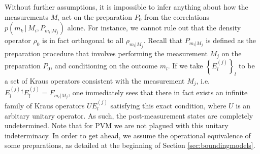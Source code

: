 Without further assumptions, it is impossible to infer anything about how the measurements $M_i$ act on the preparation $P_0$ from the correlations $p(m_k \, \vert \, M_i , P_{m_l\vert M_j} )$ alone. For instance, we cannot rule out that the density operator $\rho_0$ is in fact orthogonal to all $\rho_{m_l\vert M_j}$. Recall that $P_{m_l\vert M_j}$ is defined as the preparation procedure that involves performing the measurement $M_j$ on the preparation $P_0$, and conditioning on the outcome $m_l$. If we take $\left\{E_l^{(j)}\right\}_l$ to be a set of Kraus operators consistent with the measurement $M_j$, i.e. $E_l^{(j)}{}^{\dag}E_l^{(j)} = F_{m_l\vert M_j}$, one immediately sees that there in fact exists an infinite family of Kraus operators $UE_l^{(j)}$ satisfying this exact condition, where $U$ is an arbitary unitary operator. As such, the post-measurement states are completely undetermined.
Note that for PVM we are not plagued with this unitary indeterminacy. In order to get ahead, we assume the operational equivalence of some preparations, as detailed at the beginning of Section \ref{sec:boundingmodels}.


